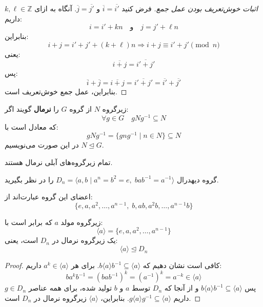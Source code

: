\begin{proof}[اثبات خوش‌تعریف بودن عمل جمع]
    فرض کنید \( \overline{i} = \overline{i'} \) و \( \overline{j} = \overline{j'} \).
    آنگاه به ازای \( k, \ell \in \mathbb{Z} \) داریم:
    \[
        i = i' + kn \quad \text{و} \quad j = j' + \ell n
    \]
    بنابراین:
    \[
        i + j = i' + j' + (k + \ell)n \Rightarrow i + j \equiv i' + j' \pmod{n}
    \]
    یعنی:
    \[
        \overline{i + j} = \overline{i' + j'}
    \]
    پس:
    \[
        \overline{i} + \overline{j} = \overline{i + j} = \overline{i' + j'} = \overline{i'} + \overline{j'}
    \]
    بنابراین، عمل جمع خوش‌تعریف است.
\end{proof}
\begin{definition}
    زیرگروه \( N \) از گروه \( G \) را \textbf{نرمال} گویند اگر:
    \[
        \forall g \in G \quad gNg^{-1} \subseteq N
    \]
    که معادل است با:
    \[
        gNg^{-1} = \{ gng^{-1} \mid n \in N \} \subseteq N
    \]
    در این صورت می‌نویسیم \( N \trianglelefteq G \).

\end{definition}
\begin{example}
    تمام زیرگروه‌های آبلی نرمال هستند.
\end{example}
\begin{example}
    گروه دیهدرال \( D_n = \langle a, b \mid a^n = b^2 = e,\; bab^{-1} = a^{-1} \rangle \) را در نظر بگیرید.

    اعضای این گروه عبارت‌اند از:
    \[
        \{ e, a, a^2, \ldots, a^{n-1},\; b, ab, a^2b, \ldots, a^{n-1}b \}
    \]

    زیرگروه مولد \( a \) که برابر است با:
    \[
        \langle a \rangle = \{ e, a, a^2, \ldots, a^{n-1} \}
    \]
    یک زیرگروه نرمال در \( D_n \) است، یعنی:
    \[
        \langle a \rangle \trianglelefteq D_n
    \]
\end{example}

\begin{proof}
    کافی است نشان دهیم که \( b \langle a \rangle b^{-1} \subseteq \langle a \rangle \).
    برای هر \( a^k \in \langle a \rangle \) داریم:
    \[
        b a^k b^{-1} = (bab^{-1})^k = (a^{-1})^k = a^{-k} \in \langle a \rangle
    \]
    پس \( b \langle a \rangle b^{-1} \subseteq \langle a \rangle \) و از آنجا که \( D_n \) توسط \( a \) و \( b \) تولید شده، برای همه عناصر \( g \in D_n \) داریم \( g \langle a \rangle g^{-1} \subseteq \langle a \rangle \).
    بنابراین، \( \langle a \rangle \) زیرگروه نرمال در \( D_n \) است.
\end{proof}

